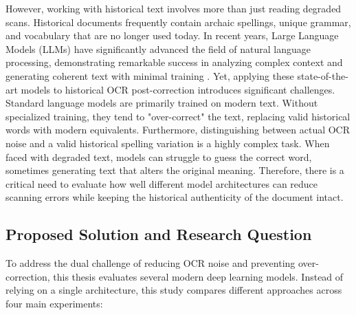 \documentclass[11pt]{extarticle}
\begin{document}
However, working with historical text involves more than just reading degraded scans. Historical documents frequently contain archaic spellings, unique grammar, and vocabulary that are no longer used today. In recent years, Large Language Models (LLMs) have significantly advanced the field of natural language processing, demonstrating remarkable success in analyzing complex context and generating coherent text with minimal training \cite{liang2023holisticevaluationlanguagemodels, zhao2026surveylargelanguagemodels}. Yet, applying these state-of-the-art models to historical OCR post-correction introduces significant challenges. Standard language models are primarily trained on modern text. Without specialized training, they tend to "over-correct" the text, replacing valid historical words with modern equivalents. Furthermore, distinguishing between actual OCR noise and a valid historical spelling variation is a highly complex task. When faced with degraded text, models can struggle to guess the correct word, sometimes generating text that alters the original meaning. Therefore, there is a critical need to evaluate how well different model architectures can reduce scanning errors while keeping the historical authenticity of the document intact.

\subsection{Proposed Solution and Research Question}

To address the dual challenge of reducing OCR noise and preventing over-correction, this thesis evaluates several modern deep learning models. Instead of relying on a single architecture, this study compares different approaches across four main experiments:
\end{document}
